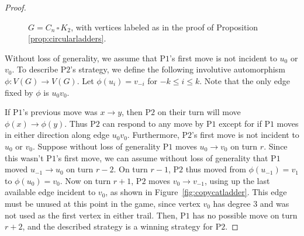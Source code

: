 \documentclass{article}
\theoremstyle{plain}
\theoremstyle{definition}
\def\pone{{\rm{P}\ensuremath{1}}}
\def\ptwo{{\rm{P}\ensuremath{2}}}
\def\poneposs{{\rm{P}\ensuremath{1}'s}}
\def\ptwoposs{{\rm{P}\ensuremath{2}'s}}
\begin{document}
\begin{proof}
\begin{figure}[ht]
\caption{$G=C_n \,\square \, K_2$, with vertices labeled as in the proof of Proposition \ref{prop:circularladders}. }
\label{fig:circularladder}
\end{figure}

Without loss of generality, we assume that \poneposs{} first move is not incident to $u_0$ or $v_0$. To describe \ptwo{}'s strategy, we define the following involutive automorphism $\phi: V(G) \to V(G)$. Let $\phi(u_i) = v_{-i}$ for $-k \leq i \leq k$. Note that the only edge fixed by $\phi$ is $u_0v_0$. 

If \pone{}'s previous move was $x \to y$, then \ptwo{} on their turn will move $\phi(x) \to \phi(y)$. Thus \ptwo{} can respond to any move by \pone{} except for if \pone{} moves in either direction along edge $u_0v_0$. Furthermore, \ptwoposs{} first move is not incident to $u_0$ or $v_0$. Suppose without loss of generality \pone{} moves $u_0 \to v_0$ on turn $r$. Since this wasn't \poneposs{} first move, we can assume without loss of generality that \pone{} moved $u_{-1} \to u_0$ on turn $r-2$. On turn $r-1$, \ptwo{} thus moved from $\phi(u_{-1}) = v_{1}$ to $\phi(u_0) = v_0$. Now on turn $r+1$, \ptwo{} moves $v_0 \to v_{-1}$, using up the last available edge incident to $v_0$, as shown in Figure~\ref{fig:copycatladder}. This edge must be unused at this point in the game, since vertex $v_0$ has degree $3$ and was not used as the first vertex in either trail. Then, \pone{} has no possible move on turn $r+2$, and the described strategy is a winning strategy for \ptwo{}. 


\end{proof}
\end{document}
